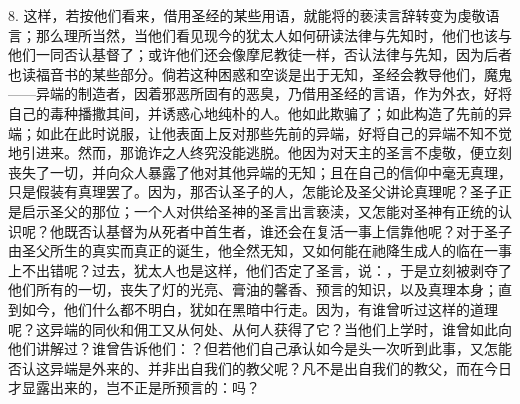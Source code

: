 8. 这样，若按他们看来，借用圣经的某些用语，就能将的亵渎言辞转变为虔敬语言；那么理所当然，当他们看见现今的犹太人如何研读法律与先知时，他们也该与他们一同否认基督了；或许他们还会像摩尼教徒一样，否认法律与先知，因为后者也读福音书的某些部分。倘若这种困惑和空谈是出于无知，圣经会教导他们，魔鬼——异端的制造者，因着邪恶所固有的恶臭，乃借用圣经的言语，作为外衣，好将自己的毒种播撒其间，并诱惑心地纯朴的人。他如此欺骗了；如此构造了先前的异端；如此在此时说服，让他表面上反对那些先前的异端，好将自己的异端不知不觉地引进来。然而，那诡诈之人终究没能逃脱。他因为对天主的圣言不虔敬，便立刻丧失了一切，并向众人暴露了他对其他异端的无知；且在自己的信仰中毫无真理，只是假装有真理罢了。因为，那否认圣子的人，怎能论及圣父讲论真理呢？圣子正是启示圣父的那位；一个人对供给圣神的圣言出言亵渎，又怎能对圣神有正统的认识呢？他既否认基督为从死者中首生者，谁还会在复活一事上信靠他呢？对于圣子由圣父所生的真实而真正的诞生，他全然无知，又如何能在祂降生成人的临在一事上不出错呢？过去，犹太人也是这样，他们否定了圣言，说：，于是立刻被剥夺了他们所有的一切，丧失了灯的光亮、膏油的馨香、预言的知识，以及真理本身；直到如今，他们什么都不明白，犹如在黑暗中行走。因为，有谁曾听过这样的道理呢？这异端的同伙和佣工又从何处、从何人获得了它？当他们上学时，谁曾如此向他们讲解过？谁曾告诉他们：？但若他们自己承认如今是头一次听到此事，又怎能否认这异端是外来的、并非出自我们的教父呢？凡不是出自我们的教父，而在今日才显露出来的，岂不正是所预言的：吗？\par

